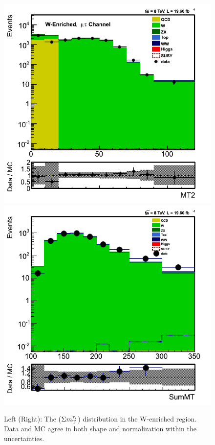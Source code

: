 \begin{figure}[!Hhtb]
\centering
\includegraphics[angle=0,scale=0.375]{TauTauFigs/MT2_WValidation.png}
\includegraphics[angle=0,scale=0.375]{TauTauFigs/summt_WValidationBinII_reBinned.png}\\
\caption{Left (Right): The \mttwo ($\Sigma m_{\rm T}^{\tau_i}$) distribution in the W-enriched region. Data and MC agree in both shape and normalization within the uncertainties.}
\label{fig:WValidation}
\end{figure}
